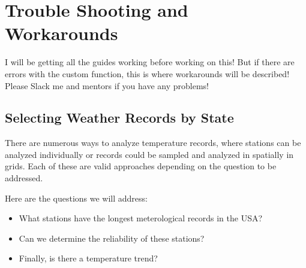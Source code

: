\documentclass{article}\usepackage[]{graphicx}\usepackage[dvipsnames]{xcolor}
\begin{document}
\section{Trouble Shooting and Workarounds}

I will be getting all the guides working before working on this! But if there are errors with the custom function, this is where workarounds will be described! Please Slack me and mentors if you have any problems!

\subsection{Selecting Weather Records by State}

There are numerous ways to analyze temperature records, where stations can be analyzed individually or records could be sampled and analyzed in spatially in grids. Each of these are valid approaches depending on the question to be addressed. 

Here are the questions we will address: 

\begin{itemize}
  \item What stations have the longest meterological records in the USA?
  \item Can we determine the reliability of these stations?
  \item Finally, is there a temperature trend?
\end{itemize}





\end{document}
